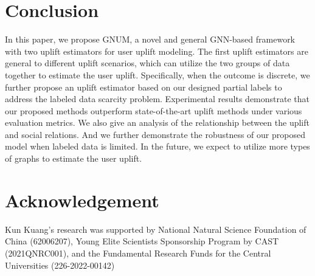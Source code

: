 \section{Conclusion}
In this paper, we propose GNUM, a novel and general GNN-based framework with two uplift estimators for user uplift modeling. The first uplift estimators are general to different uplift scenarios, which can utilize the two groups of data together to estimate the user uplift. Specifically, when the outcome is discrete, we further propose an uplift estimator based on our designed partial labels to address the labeled data scarcity problem. Experimental results demonstrate that our proposed methods outperform state-of-the-art uplift methods under various evaluation metrics.  We also give an analysis of the relationship between the uplift and social relations. And we further demonstrate the robustness of our proposed model when labeled data is limited.  In the future, we expect to utilize more types of graphs to estimate the user uplift. 

\section{Acknowledgement}
Kun Kuang's research was supported by National Natural Science Foundation of China (62006207), Young Elite Scientists Sponsorship Program by CAST (2021QNRC001), and the Fundamental Research Funds for the Central Universities (226-2022-00142)
